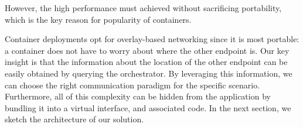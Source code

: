 However, the high performance must achieved without sacrificing portability,
which is the key reason for popularity of containers. 

Container deployments opt for overlay-based networking since it is most
portable: a container does not have to worry about where the other endpoint is.
Our key insight is that the information about the location of the other endpoint
can be easily obtained by querying the orchestrator. By leveraging this
information, we can choose the right communication paradigm for the specific
scenario. Furthermore, all of this complexity can be hidden from the application
by bundling it into a virtual interface, and associated code. In the next
section, we sketch the architecture of our solution.

